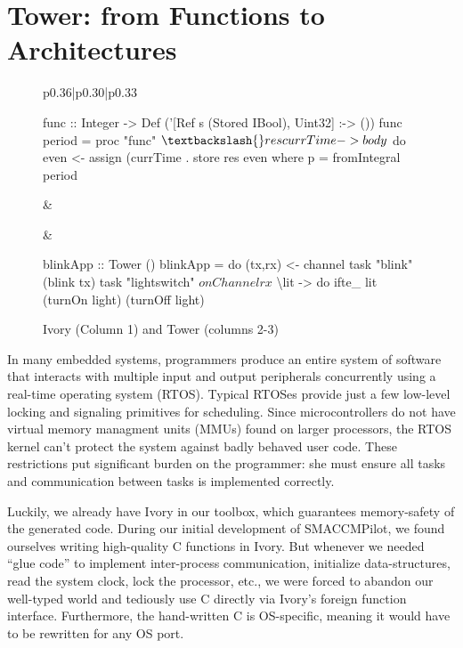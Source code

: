 \section{Tower: from Functions to Architectures}
\label{sec:tower}

\begin{figure*}
  \begin{tabular}{p{}|p{}|p{}}
    \begin{smcode}
func :: Integer
     -> Def ('[Ref s (Stored IBool), Uint32]
             :-> ())
func period = proc "func" $ \textbackslash{}res currTime ->
  body $ do
    even <- assign (currTime .%
    store res even
    where
    p = fromIntegral period
    \end{smcode} &
     &
    \begin{smcode}
blinkApp :: Tower ()
blinkApp = do
  (tx,rx) <- channel
  task "blink" (blink tx)
  task "lightswitch" $
    onChannel rx $
      \textbackslash{}lit -> do
        ifte_ lit (turnOn light)
                  (turnOff light)
    \end{smcode}
  \end{tabular}
  \caption{Ivory (Column 1) and Tower (columns 2-3)}
  \label{fig:tower-ex}
\end{figure*}

In many embedded systems, programmers produce an entire system of software
that interacts with multiple input and output peripherals concurrently using a
real-time operating system (RTOS). Typical RTOSes provide just a few low-level
locking and signaling primitives for scheduling. Since microcontrollers do not
have virtual memory managment units (MMUs) found on larger processors, the RTOS
kernel can't protect the system against badly behaved user code. These
restrictions put significant burden on the programmer: she must ensure all tasks
and communication between tasks is implemented correctly.

Luckily, we already have Ivory in our toolbox, which guarantees memory-safety of
the generated code. During our initial development of SMACCMPilot, we found
ourselves writing high-quality C functions in Ivory.  But whenever we needed
``glue code'' to implement inter-process communication, initialize
data-structures, read the system clock, lock the processor, etc., we were forced
to abandon our well-typed world and tediously use C directly via Ivory's foreign
function interface.  Furthermore, the hand-written C is OS-specific, meaning it
would have to be rewritten for any OS port.

